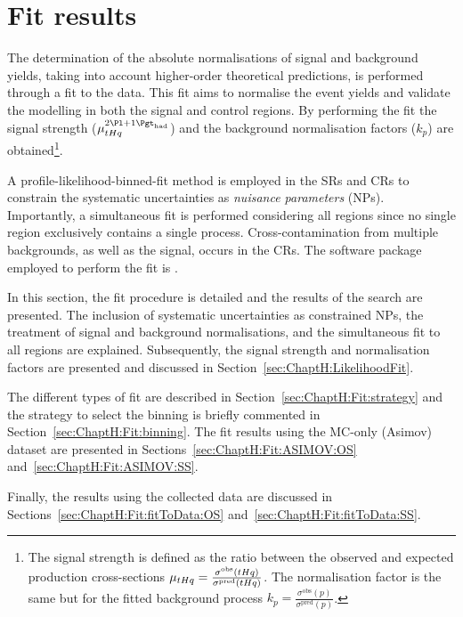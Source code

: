 \section{Fit results}
\label{sec:ChaptH:Fit}
The determination of the absolute normalisations of signal and background yields, 
taking into account higher-order theoretical predictions, is performed through a fit 
to the data. This fit aims to normalise the event yields and validate the modelling in 
both the signal and control regions. By performing the fit the signal 
strength
($\mu_{\tHq}^{\dileptau}$) and
the background normalisation factors ($k_{p}$) are 
obtained\footnote{The signal strength is defined as the ratio between the observed
and expected production cross-sections  $\mu_{tHq} = \frac{\sigma^{\text{obs}}(tHq)}{\sigma^{\text{pred}}(tHq)}$.
The normalisation factor is the same but for the fitted background 
process $k_{p} = \frac{\sigma^{\text{obs}}(p)}{\sigma^{\text{pred}}(p)}$. }. 

A profile-likelihood-binned-fit method is employed in the SRs and CRs to constrain the systematic 
uncertainties as \textit{nuisance parameters} (NPs). Importantly, a simultaneous 
fit is performed considering all regions since no single region exclusively contains a 
single process. Cross-contamination from multiple backgrounds, as well as the signal, 
occurs in the CRs. The software package employed to perform the fit is \trexfitter. %


In this section, the fit procedure is detailed and the results of the \tHq search
are presented. The inclusion of 
systematic uncertainties as constrained NPs, the treatment of signal 
and background normalisations, and the simultaneous fit to all regions are explained. 
Subsequently, the signal strength and normalisation factors are presented and discussed 
in Section~\ref{sec:ChaptH:LikelihoodFit}.

The different types of fit are described in Section~\ref{sec:ChaptH:Fit:strategy} and the
strategy to select the binning is briefly commented in Section~\ref{sec:ChaptH:Fit:binning}.
The fit results using the MC-only (Asimov) dataset are presented in Sections~\ref{sec:ChaptH:Fit:ASIMOV:OS}
and~\ref{sec:ChaptH:Fit:ASIMOV:SS}.

Finally, the results using the collected data are discussed in
Sections~\ref{sec:ChaptH:Fit:fitToData:OS} and~\ref{sec:ChaptH:Fit:fitToData:SS}.



